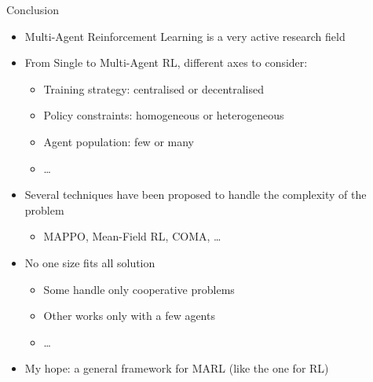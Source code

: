 \documentclass[presentation, 8pt]{beamer}\mode<presentation>{\usetheme{AMSBolognaFC}}
\begin{document}
\begin{frame}{Conclusion}
	\begin{itemize}
		\item Multi-Agent Reinforcement Learning is a very active research field
		\item From Single to Multi-Agent RL, different axes to consider:
		\begin{itemize}
			\item Training strategy: centralised or decentralised
			\item Policy constraints: homogeneous or heterogeneous
			\item Agent population: few or many
			\item \dots
		\end{itemize}
		\item Several techniques have been proposed to handle the complexity of the problem
		\begin{itemize}
			\item MAPPO, Mean-Field RL, COMA, \dots
		\end{itemize}
		\item No one size fits all solution 
		\begin{itemize}
			\item Some handle only cooperative problems
			\item Other works only with a few agents
			\item \dots
		\end{itemize}
		\item My hope: a general framework for MARL (like the one for RL)
	\end{itemize}
\end{frame}
\section*{}

\frame{\titlepage}

\section*{\refname}

\end{document}
